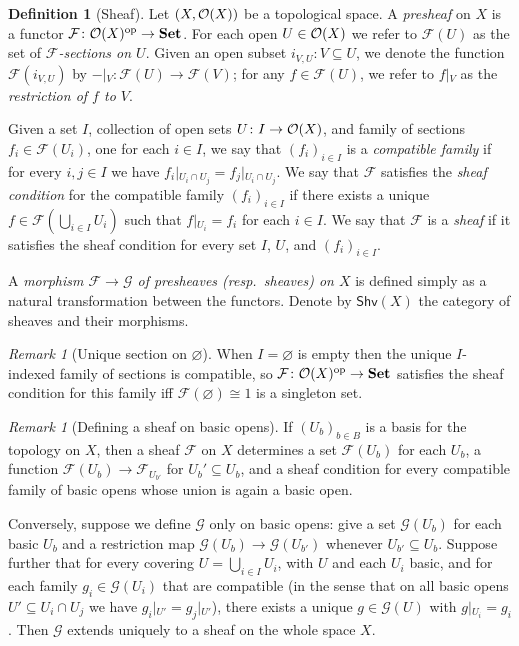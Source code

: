 \documentclass[11pt, oneside, article]{memoir}
\theoremstyle{plain}
\theoremstyle{definition}
\newtheorem{definition}[theorem]{Definition}
\theoremstyle{remark}
\newtheorem{remark}[theorem]{Remark}
\renewcommand{\ss}{\subseteq}
\newcommand{\cat}[1]{\mathcal{#1}}
\newcommand{\Cat}[1]{\mathbf{#1}}
\newcommand{\fun}[1]{\mathcal{#1}}
\newcommand{\Fun}[1]{\mathsf{#1}}
\newcommand{\sheaf}[1]{\fun{#1}}
\newcommand{\smset}{\Cat{Set}}
\newcommand{\tn}[1]{\textnormal{#1}}
\newcommand{\shv}{\Fun{Shv}}
\newcommand{\Op}[1][undef]{\ifthenelse{\equal{#1}{undef}}{\mathcal{O}}{\mathcal{O}(#1)}}
\newcommand{\op}{^\tn{op}}
\newcommand{\rest}[2]{#1\big|\hspace{0in}_{#2}}
\begin{document}
\begin{definition}[Sheaf]\label{def.sheaf}
Let $(X,\Op[X])$ be a topological space. A \emph{presheaf} on $X$ is a functor $\sheaf{F}\colon\Op[X]\op\to\smset$. For each open $U\in\Op[X]$ we refer to $\sheaf{F}(U)$ as the set of \emph{$\sheaf{F}$-sections on $U$}. Given an open subset $i_{V,U}\colon V\ss U$, we denote the function $\sheaf{F}(i_{V,U})$ by $\rest{-}{V}\colon\sheaf{F}(U)\to\sheaf{F}(V)$; for any $f\in\sheaf{F}(U)$, we refer to $\rest{f}{V}$ as the \emph{restriction of $f$ to $V$}.

Given a set $I$, collection of open sets $U\colon I\to\Op[X]$, and family of sections $f_i\in\sheaf{F}(U_i)$, one for each $i\in I$, we say that $(f_i)_{i\in I}$ is a \emph{compatible family} if for every $i,j\in I$ we have $\rest{f_i}{U_i\cap U_j}=\rest{f_j}{U_i\cap U_j}$. We say that $\sheaf{F}$ satisfies the \emph{sheaf condition} for the compatible family $(f_i)_{i\in I}$ if there exists a unique $f\in \sheaf{F}(\bigcup_{i\in I}U_i)$ such that $\rest{f}{U_i}=f_i$ for each $i\in I$. We say that $\sheaf{F}$ is a \emph{sheaf} if it satisfies the sheaf condition for every set $I$, $U$, and $(f_i)_{i\in I}$.

A \emph{morphism $\sheaf{F}\to\sheaf{G}$ of presheaves (resp.\ sheaves) on $X$} is defined simply as a natural transformation between the functors. Denote by $\shv(X)$ the category of sheaves and their morphisms.
\end{definition}

\begin{remark}[Unique section on $\varnothing$]\label{rem.unique_sec_empty}
When $I=\varnothing$ is empty then the unique $I$-indexed family of sections is compatible, so $\cat{F}\colon\Op[X]\op\to\smset$ satisfies the sheaf condition for this family iff $\sheaf{F}(\varnothing)\cong 1$ is a singleton set.
\end{remark}

\begin{remark}[Defining a sheaf on basic opens]
If $(U_b)_{b\in B}$ is a basis for the topology on $X$, then a sheaf $\sheaf{F}$ on $X$ determines a set $\sheaf{F}(U_b)$ for each $U_b$, a function $\sheaf{F}(U_b)\to\sheaf{F}_{U_{b'}}$ for $U_b'\ss U_b$, and a sheaf condition for every compatible family of basic opens whose union is again a basic open. 

Conversely, suppose we define $\sheaf{G}$ only on basic opens: give a set $\sheaf{G}(U_b)$ for each basic $U_b$ and a restriction map $\sheaf{G}(U_b)\to\sheaf{G}(U_{b'})$ whenever $U_{b'}\ss U_b$. Suppose further that for every covering $U=\bigcup_{i\in I}U_i$, with $U$ and each $U_i$ basic, and for each family $g_i\in\sheaf{G}(U_i)$ that are compatible (in the sense that on all basic opens $U'\ss U_i\cap U_j$ we have $\rest{g_i}{U'}=\rest{g_j}{U'}$), there exists a unique $g\in \sheaf{G}(U)$ with $\rest{g}{U_i}=g_i$. Then $\sheaf{G}$ extends uniquely to a sheaf on the whole space $X$.
\end{remark}
\end{document}
